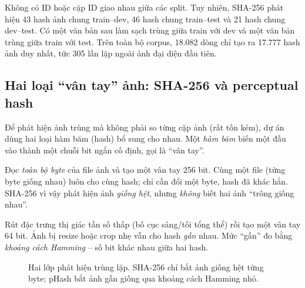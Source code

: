 Không có ID hoặc cặp ID giao nhau giữa các split. Tuy nhiên, SHA-256 phát hiện
43 hash ảnh chung train--dev, 46 hash chung train--test và 21 hash chung
dev--test. Có một văn bản sau làm sạch trùng giữa train với dev và một văn bản
trùng giữa train với test. Trên toàn bộ corpus, 18.082 dòng chỉ tạo ra 17.777
hash ảnh duy nhất, tức 305 lần lặp ngoài ảnh đại diện đầu tiên.

\subsection{Hai loại ``vân tay'' ảnh: SHA-256 và perceptual hash}

Để phát hiện ảnh trùng mà không phải so từng cặp ảnh (rất tốn kém), dự án dùng
hai loại hàm băm (hash) bổ sung cho nhau. Một \emph{hàm băm} biến một đầu vào
thành một chuỗi bit ngắn cố định, gọi là ``vân tay''.

\begin{description}[leftmargin=3.6cm,style=nextline]
  \item[SHA-256] Đọc \emph{toàn bộ byte} của file ảnh và tạo một vân tay 256 bit.
        Cùng một file (từng byte giống nhau) luôn cho cùng hash; chỉ cần đổi một
        byte, hash đã khác hẳn. SHA-256 vì vậy phát hiện ảnh \emph{giống hệt},
        nhưng \emph{không} biết hai ảnh ``trông giống nhau''.
  \item[Perceptual hash (pHash)] Rút đặc trưng thị giác tần số thấp (bố cục
        sáng/tối tổng thể) rồi tạo một vân tay 64 bit. Ảnh bị resize hoặc crop
        nhẹ vẫn cho hash \emph{gần} nhau. Mức ``gần'' đo bằng \emph{khoảng cách
        Hamming} -- số bit khác nhau giữa hai hash.
\end{description}

\begin{figure}[H]
\centering
{}
\caption{Hai lớp phát hiện trùng lặp. SHA-256 chỉ bắt ảnh giống hệt từng byte;
pHash bắt ảnh gần giống qua khoảng cách Hamming nhỏ.}
\label{fig:hash-explainer}
\end{figure}

